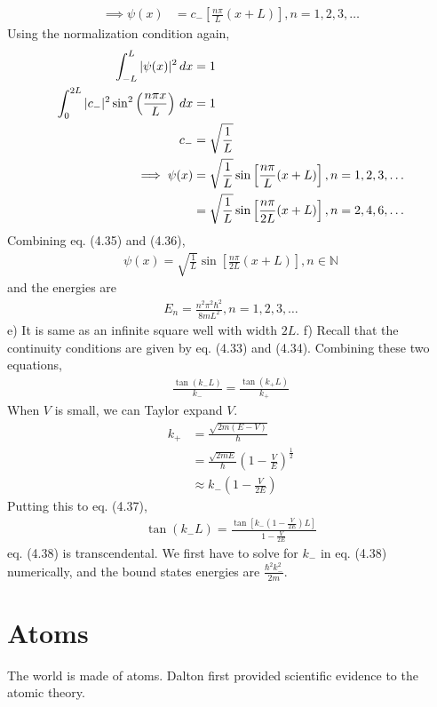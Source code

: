 \documentclass[12pt]{book} %
\numberwithin{equation}{chapter}
\def\N{\mathbb{N}}
\begin{document}
\begin{solbox}
\begin{align*}
\implies \psi(x)&=c_{-}\left[\frac{n\pi}{L}(x+L)\right], n=1, 2, 3, \dots
\end{align*}
Using the normalization condition again,
\begin{align}
\int_{-L}^{L}|\psi(x)|^{2}\,dx&=1\notag\\
\int_{0}^{2L}|c_{-}|^{2}\sin^{2}\left(\frac{n\pi x}{L}\right)\,dx&=1\notag\\
c_{-}&=\sqrt{\frac{1}{L}}\notag\\
\implies \psi(x)&=\sqrt{\frac{1}{L}}\sin\left[\frac{n\pi}{L}(x+L)\right], n=1, 2, 3, \dots\notag\\
&=\sqrt{\frac{1}{L}}\sin\left[\frac{n\pi}{2L}(x+L)\right], n=2, 4, 6, \dots
\end{align}
Combining eq. (4.35) and (4.36),
\begin{align*}
\psi(x)=\sqrt{\frac{1}{L}}\sin\left[\frac{n\pi}{2L}(x+L)\right], n\in\N
\end{align*}
and the energies are
\begin{align*}
E_{n}=\frac{n^{2}\pi^{2}\hbar^{2}}{8mL^{2}}, n=1, 2, 3, \dots
\end{align*}
e) It is same as an infinite square well with width $2L$.\bigskip\newline
f) Recall that the continuity conditions are given by eq. (4.33) and (4.34). Combining these two equations,
\begin{align}
\frac{\tan(k_{-}L)}{k_{-}}=\frac{\tan(k_{+}L)}{k_{+}}
\end{align}
When $V$ is small, we can Taylor expand $V$.
\begin{align*}
k_{+}&=\frac{\sqrt{2m(E-V)}}{\hbar}\\
&=\frac{\sqrt{2mE}}{\hbar}\left(1-\frac{V}{E}\right)^{\frac{1}{2}}\\
&\approx k_{-}\left(1-\frac{V}{2E}\right)
\end{align*}
Putting this to eq. (4.37),
\begin{align}
\tan(k_{-}L)=\frac{\tan\left[k_{-}\left(1-\frac{V}{2E}\right)L\right]}{1-\frac{V}{2E}}
\end{align}
eq. (4.38) is transcendental. We first have to solve for $k_{-}$ in eq. (4.38) numerically, and the bound states energies are $\frac{\hbar^{2}k_{-}^{2}}{2m}$.
\end{solbox}

\newpage
{} %
\chapter{Atoms}
The world is made of atoms. Dalton first provided scientific evidence to the atomic theory.
\end{document}
